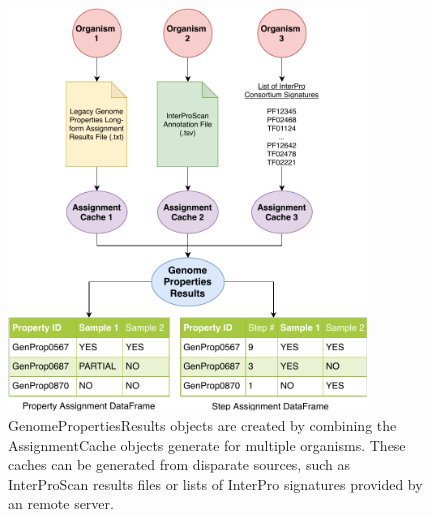 \begin{figure}[!ht]
  \centering
	\includegraphics[width=0.85\textwidth]{media/assignment_results_overview.pdf}
	 \caption{GenomePropertiesResults objects are created by combining the AssignmentCache objects generate for multiple organisms. These caches can be generated from disparate sources, such as InterProScan results files or lists of InterPro signatures provided by an remote server.}
	 \label{fig:resultscreation}
\end{figure}

